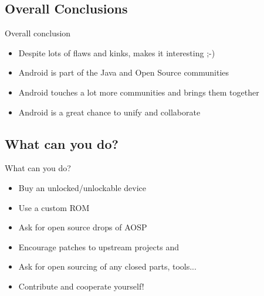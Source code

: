 \documentclass[aspectratio=169]{beamer}
\begin{document}
  \subsection{Overall Conclusions}
    \begin{frame}{Overall conclusion}
      \begin{itemize}
        \item<1-> Despite lots of flaws and kinks, makes it interesting ;-)
        \item<2-> Android is part of the Java and Open Source communities
        \item<3-> Android touches a lot more communities and brings them together
        \item<4-> Android is a great chance to unify and collaborate 
      \end{itemize}
    \end{frame}

  \subsection{What can you do?}
    \begin{frame}{What can you do?}
      \begin{itemize}
        \item<1-> Buy an unlocked/unlockable device
        \item<2-> Use a custom ROM
        \item<3-> Ask for open source drops of AOSP 
        \item<4-> Encourage patches to upstream projects and 
        \item<5-> Ask for open sourcing of any closed parts, tools...
        \item<6-> Contribute and cooperate yourself! 
      \end{itemize}
    \end{frame}
\end{document}
